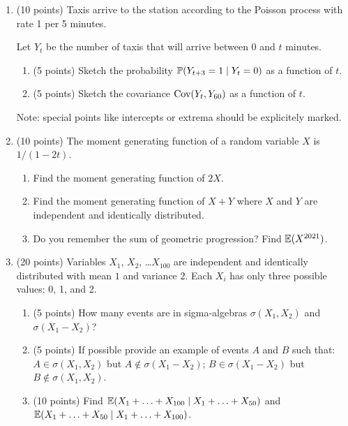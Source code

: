 \begin{enumerate}
\item (10 points) Taxis arrive to the station according to the Poisson process with rate 1 per 5 minutes. 

Let $Y_t$ be the number of taxis that will arrive between 0 and $t$ minutes.

\begin{enumerate}
  \item (5 points) Sketch the probability $\P(Y_{t+3} = 1 \mid Y_t = 0)$ as a function of $t$.
  \item (5 points) Sketch the covariance $\Cov(Y_t, Y_{60})$ as a function of $t$.
\end{enumerate}

Note: special points like intercepts or extrema should be explicitely marked.

\item (10 points) The moment generating function of a random variable $X$ is $1/(1-2t)$.
\begin{enumerate}
    \item Find the moment generating function of $2X$.
    \item Find the moment generating function of $X + Y$ where $X$ and $Y$ are independent and identically distributed.
    \item Do you remember the sum of geometric progression? Find $\E(X^{2021})$.
\end{enumerate}

\item (20 points) Variables $X_1$, $X_2$, \ldots $X_{100}$ are independent and identically distributed
with mean $1$ and variance $2$. Each $X_i$ has only three possible values: 0, 1, and 2. 

\begin{enumerate}
  \item (5 points) How many events are in sigma-algebras $\sigma(X_1, X_2)$ and $\sigma(X_1 - X_2)$?
  \item (5 points) If possible provide an example of events $A$ and $B$ such that: $A\in \sigma(X_1, X_2)$ but $A\not\in\sigma(X_1 - X_2)$; $B\in \sigma(X_1 - X_2)$ but $B\not\in\sigma(X_1, X_2)$.
  \item (10 points) Find $\E(X_1 + \ldots + X_{100} \mid X_1 + \ldots + X_{50})$ and $\E(X_1 + \ldots + X_{50} \mid X_1 + \ldots + X_{100})$.
\end{enumerate}






\end{enumerate}





